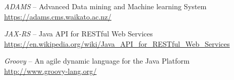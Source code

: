 %

\begin{thebibliography}{999}

		\textit{ADAMS} -- Advanced Data mining and Machine learning System \\
		\url{https://adams.cms.waikato.ac.nz/}{}

		\textit{JAX-RS} -- Java API for RESTful Web Services \\
		\url{https://en.wikipedia.org/wiki/Java_API_for_RESTful_Web_Services}{}

		\textit{Groovy} -- An agile dynamic language for the Java Platform \\
		\url{http://www.groovy-lang.org/}{}

\end{thebibliography}
